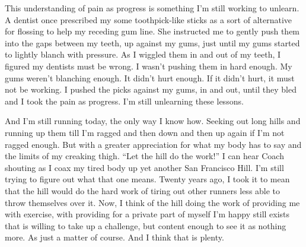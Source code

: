 \documentclass[12pt, oneside]{memoir}
\begin{document}
This understanding of pain as progress is something I'm still working
to unlearn.
A dentist once prescribed my some toothpick-like sticks as a sort of
alternative for flossing to help my receding gum line.
She instructed me to gently push them into the gaps between my teeth,
up against my gums, just until my gums started to lightly blanch with
pressure.
As I wiggled them in and out of my teeth, I figured my dentists must
be wrong.
I wasn't pushing them in hard enough.
My gums weren't blanching enough.
It didn't hurt enough.
If it didn't hurt, it must not be working.
I pushed the picks against my gums, in and out, until they bled and I
took the pain as progress.
I'm still unlearning these lessons.

And I'm still running today, the only way I know how.
Seeking out long hills and running up them till I'm ragged and then
down and then up again if I'm not ragged enough.
But with a greater appreciation for what my body has to say and the
limits of my creaking thigh.
``Let the hill do the work!'' I can hear Coach shouting as I coax my
tired body up yet another San Francisco Hill.
I'm still trying to figure out what that one means.
Twenty years ago, I took it to mean that the hill would do the hard
work of tiring out other runners less able to throw themselves over
it.
Now, I think of the hill doing the work of providing me with exercise,
with providing for a private part of myself I'm happy still exists
that is willing to take up a challenge, but content enough to see it
as nothing more.
As just a matter of course.
And I think that is plenty.





\end{document}
